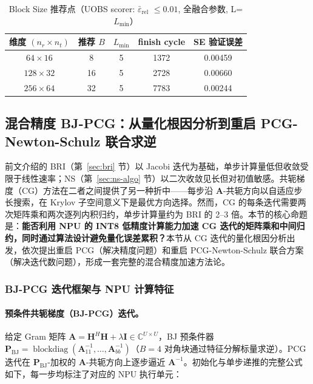 \documentclass{CjC}
\begin{document}
    \begin{table}[H]
        \centering
        \caption{Block Size 推荐点（UOBS scorer: $\bar{\varepsilon}_{\text{rel}}$ $\leq0.01$,
        全融合参数, L=$L_{\min}$）}
        \begin{tabular}{c|cccc}
            \toprule 维度 $(n_{r}\times n_{t})$ & 推荐 $B$ & $L_{\min}$ & finish cycle & SE 验证误差 \\
            \midrule $64\times16$             & 8      & 5          & 1372         & 0.00459    \\
            $128\times32$                     & 16     & 5          & 2728         & 0.00660    \\
            $256\times64$                     & 32     & 5          & 7783         & 0.00244    \\
            \bottomrule
        \end{tabular}
    \end{table}


    

    \subsection{混合精度 BJ-PCG：从量化根因分析到重启 PCG-Newton-Schulz 联合求逆}
    \label{sec:mixed-precision-pcg}
    
    前文介绍的 BRI（第~\ref{sec:bri} 节）以 Jacobi 迭代为基础，单步计算量低但收敛受限于线性速率；NS（第~\ref{sec:ns-algo} 节）以二次收敛见长但对初值敏感。共轭梯度（CG）方法在二者之间提供了另一种折中——每步沿 $\bm{A}$-共轭方向以自适应步长搜索，在 Krylov 子空间意义下是最优方向选择。然而，CG 的每条迭代需要两次矩阵乘和两次逐列内积归约，单步计算量约为 BRI 的 2--3 倍。本节的核心命题是：\textbf{能否利用 NPU 的 INT8 低精度计算能力加速 CG 迭代的矩阵乘和中间归约，同时通过算法设计避免量化误差累积？}本节从 CG 迭代的量化根因分析出发，依次提出重启 PCG（解决精度问题）和重启 PCG-Newton-Schulz 联合方案（解决迭代数问题），形成一套完整的混合精度加速方法论。
    
    \subsubsection{BJ-PCG 迭代框架与 NPU 计算特征}
    
    \paragraph{预条件共轭梯度（BJ-PCG）迭代。}
    给定 Gram 矩阵 $\bm{A}=\bm{H}^{H}\bm{H}+\lambda\bm{I}\in\mathbb{C}^{U\times U}$，BJ 预条件器
    $\bm{P}_{\text{BJ}}=\operatorname{blockdiag}(\bm{A}_{11}^{-1},\dots,\bm{A}_{bb}^{-1})$（$B=4$ 对角块通过特征分解标量求逆）。PCG 迭代在 $\bm{P}_{\text{BJ}}$-加权的 $\bm{A}$-共轭方向上逐步逼近 $\bm{A}^{-1}$。初始化与单步递推的完整公式如下，每一步均标注了对应的 NPU 执行单元：
    
\end{document}
